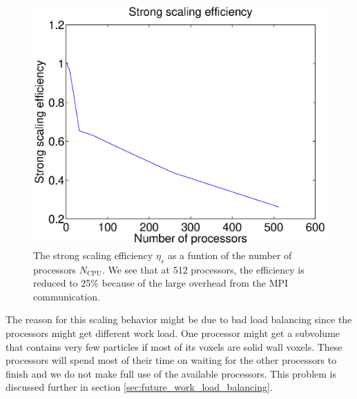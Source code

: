 \begin{figure}[h]
\begin{center}
\includegraphics[width=\textwidth, trim=0cm 0cm 0cm 0cm, clip]{DSMC/figures/strong_scaling.eps}
\end{center}
\caption{The strong scaling efficiency $\eta_s$ as a funtion of the number of processors $N_\text{CPU}$. We see that at 512 processors, the efficiency is reduced to 25\% because of the large overhead from the MPI communication.}
\label{fig:dsmc_strong_scaling}
\end{figure}
The reason for this scaling behavior might be due to bad load balancing since the processors might get different work load. One processor might get a subvolume that contains very few particles if most of its voxels are solid wall voxels. These processors will spend most of their time on waiting for the other processors to finish and we do not make full use of the available processors. This problem is discussed further in section \ref{sec:future_work_load_balancing}. 
